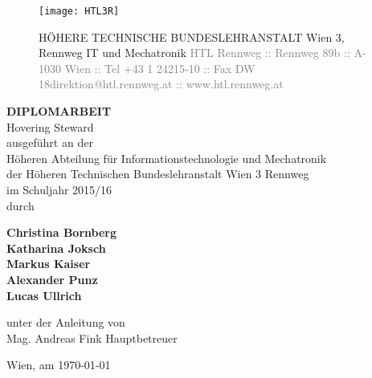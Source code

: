 \documentclass[11pt]{scrartcl}
\begin{document}
\onehalfspacing
\begin{titlepage}
\vspace*{-2.5cm}
\enlargethispage{4cm}
\thispagestyle{empty}
	\begin{figure}[ht]
		\begin{minipage}[t]{0.25\textwidth}
			\raggedright
			\vspace{0pt}
			\texttt{[image: HTL3R]}
		\end{minipage}
		\begin{minipage}[t]{0.7\textwidth}
			\vspace{0pt}
			\small{HÖHERE TECHNISCHE BUNDESLEHRANSTALT Wien 3, Rennweg\newline}
			\small{IT und Mechatronik\newline}
			\textcolor{gray}{\scriptsize{HTL Rennweg :: Rennweg 89b :: A-1030 Wien :: Tel +43 1 24215-10 :: Fax DW 18\newline direktion@htl.rennweg.at :: www.htl.rennweg.at}}
		\end{minipage}
	\end{figure}
\begin{center}
\vspace{10pt}
{\huge{\textbf{DIPLOMARBEIT\\}}}
\vspace{40pt}
{\huge{Hovering Steward\\}}
\vspace{60pt}
ausgeführt an der\\
Höheren Abteilung für Informationstechnologie und Mechatronik\\
der Höheren Technischen Bundeslehranstalt Wien 3 Rennweg\\
\vspace{30pt}
im Schuljahr 2015/16\\
\vspace{40pt}
durch\\
\begin{doublespace}
	\textbf{
		Christina Bornberg\\
		Katharina Joksch\\
		Markus Kaiser\\
		Alexander Punz\\
		Lucas Ullrich\\
	}
\end{doublespace}
\vspace{30pt}
unter der Anleitung von\\
Mag. Andreas Fink Hauptbetreuer\\
\vfill
\end{center}
Wien, am \today\\
\end{titlepage}
\pagestyle{scrheadings}
\clearscrheadfoot
{}
\ofoot{\pagemark}
\end{document}
